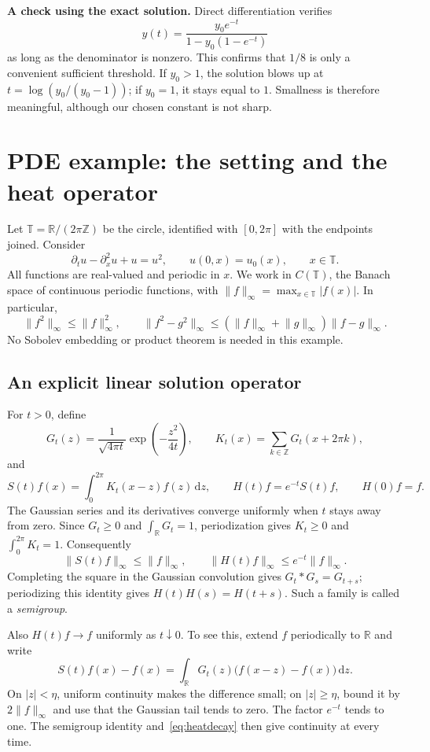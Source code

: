 \documentclass[a4paper,10pt]{article}
\numberwithin{equation}{section}
\theoremstyle{definition}
\theoremstyle{remark}
\newcommand{\R}{\mathbb R}
\newcommand{\T}{\mathbb T}
\newcommand{\norm}[1]{\lVert#1\rVert}
\newcommand{\abs}[1]{\lvert#1\rvert}
\newcommand{\dd}{\,\mathrm d}
\newcommand{\pageheading}[1]{\section{#1}}
\begin{document}
\textbf{A check using the exact solution.}
Direct differentiation verifies
\[
y(t)=\frac{y_0e^{-t}}{1-y_0(1-e^{-t})}
\]
as long as the denominator is nonzero. This confirms that $1/8$ is only a
convenient sufficient threshold. If $y_0>1$, the solution blows up at
$t=\log(y_0/(y_0-1))$; if $y_0=1$, it stays equal to $1$. Smallness is
therefore meaningful, although our chosen constant is not sharp.

\newpage
\pageheading{PDE example: the setting and the heat operator}
Let $\T=\R/(2\pi\mathbb Z)$ be the circle, identified with $[0,2\pi]$
with the endpoints joined. Consider
\begin{equation}\label{eq:pde}
\partial_tu-\partial_x^2u+u=u^2,\qquad u(0,x)=u_0(x),\qquad x\in\T.
\end{equation}
All functions are real-valued and periodic in $x$. We work in
$C(\T)$, the Banach space of continuous periodic functions, with
$\norm{f}_\infty=\max_{x\in\T}\abs{f(x)}$. In particular,
\begin{equation}\label{eq:product}
\norm{f^2}_\infty\leq\norm{f}_\infty^2,\qquad
\norm{f^2-g^2}_\infty\leq
(\norm{f}_\infty+\norm{g}_\infty)\norm{f-g}_\infty.
\end{equation}
No Sobolev embedding or product theorem is needed in this example.

\subsection*{An explicit linear solution operator}
For $t>0$, define
\[
G_t(z)=\frac{1}{\sqrt{4\pi t}}\exp\!\left(-\frac{z^2}{4t}\right),\qquad
K_t(x)=\sum_{k\in\mathbb Z}G_t(x+2\pi k),
\]
and
\[
S(t)f(x)=\int_0^{2\pi}K_t(x-z)f(z)\dd z,\qquad
H(t)f=e^{-t}S(t)f,\qquad H(0)f=f.
\]
The Gaussian series and its derivatives converge uniformly when $t$ stays
away from zero. Since $G_t\geq0$ and $\int_\R G_t=1$, periodization gives
$K_t\geq0$ and $\int_0^{2\pi}K_t=1$. Consequently
\begin{equation}\label{eq:heatdecay}
\norm{S(t)f}_\infty\leq\norm{f}_\infty,
\qquad \norm{H(t)f}_\infty\leq e^{-t}\norm{f}_\infty.
\end{equation}
Completing the square in the Gaussian convolution gives
$G_t*G_s=G_{t+s}$; periodizing this identity gives
$H(t)H(s)=H(t+s)$. Such a family is called a \emph{semigroup}.

Also $H(t)f\to f$ uniformly as $t\downarrow0$. To see this, extend $f$
periodically to $\R$ and write
\[
S(t)f(x)-f(x)=\int_\R G_t(z)\bigl(f(x-z)-f(x)\bigr)\dd z.
\]
On $\abs z<\eta$, uniform continuity makes the difference small; on
$\abs z\geq\eta$, bound it by $2\norm f_\infty$ and use that the Gaussian
tail tends to zero. The factor $e^{-t}$ tends to one. The semigroup identity
and~\eqref{eq:heatdecay} then give continuity at every time.
\end{document}
